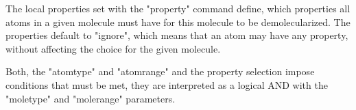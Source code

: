The local properties set with the "property" command define, which properties 
all atoms in a given molecule must have for this molecule to be demolecularized.
The properties default to "ignore", which means that an atom may have any
property, without affecting the choice for the given molecule.

Both, the "atomtype" and "atomrange" and the property selection impose 
conditions that must be met, they
are interpreted as a logical AND with the "moletype" and "molerange" parameters.

